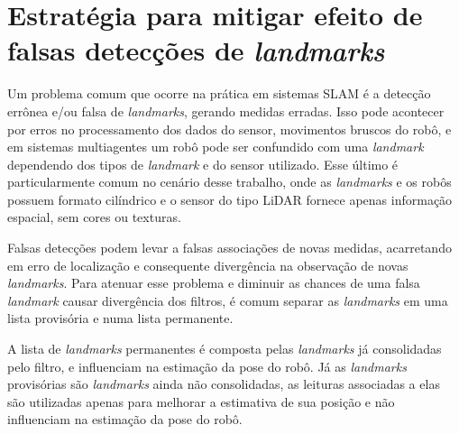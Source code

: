 \section{Estratégia para mitigar efeito de falsas detecções de \textit{landmarks}}
Um problema comum que ocorre na prática em sistemas SLAM é a detecção 
errônea e/ou falsa de \textit{landmarks}, gerando medidas erradas. Isso pode 
acontecer por erros no processamento dos dados do sensor, movimentos bruscos 
do robô, e em sistemas multiagentes um robô pode ser confundido com uma \textit{landmark} dependendo dos tipos de \textit{landmark} e do sensor utilizado. 
Esse último é particularmente comum no cenário desse trabalho, onde as \textit{landmarks} e os robôs possuem formato cilíndrico e o sensor do tipo LiDAR 
fornece apenas informação espacial, sem cores ou texturas.

Falsas detecções podem levar a falsas associações de novas medidas, 
acarretando em erro de localização e consequente divergência na 
observação de novas \textit{landmarks}. Para atenuar esse problema e 
diminuir as chances de uma falsa \textit{landmark} causar 
divergência dos filtros, é comum separar as \textit{landmarks} em uma lista provisória e numa lista permanente.

A lista de \textit{landmarks} permanentes é composta pelas 
\textit{landmarks} já consolidadas pelo filtro, e influenciam 
na estimação da pose do robô. Já as \textit{landmarks} 
provisórias são \textit{landmarks} ainda não consolidadas, as leituras 
associadas a elas são utilizadas apenas para melhorar a estimativa de 
sua posição e não influenciam na estimação da pose do robô.

